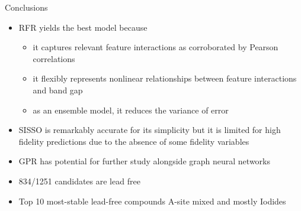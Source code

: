 \documentclass[10pt, aspectratio=169, presentation]{beamer}
\begin{document}
\begin{frame}[label={sec:orgbe8b3aa}]{Conclusions}
\begin{itemize}
\item RFR yields the best model because
\begin{itemize}
\item it captures relevant feature interactions as corroborated by Pearson correlations
\item it flexibly represents nonlinear relationships between feature interactions and band gap
\item as an ensemble model, it reduces the variance of error
\end{itemize}
\item SISSO is remarkably accurate for its simplicity but it is limited
for high fidelity predictions due to the absence of some fidelity
variables
\item GPR has potential for further study alongside graph neural networks
\item \alert{834/1251 candidates are lead free}
\item Top 10 most-stable lead-free compounds A-site mixed and mostly Iodides
\end{itemize}
\end{frame}
\end{document}
